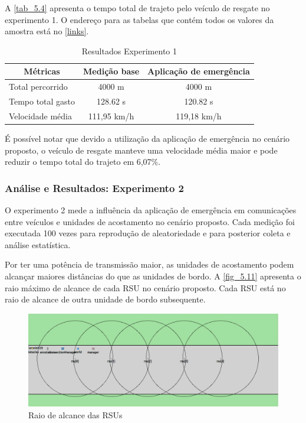 \documentclass[
12pt,				%
openright,			%
oneside,			%
a4paper,			%
brazil,				%
]{abntex2}
\begin{document}
	\par A \autoref{tab_5.4} apresenta o tempo total de trajeto pelo veículo de resgate no experimento 1. O endereço para as tabelas que contém todos os valores da amostra está no \autoref{links}.
		
	\begin{table}[H]
		\centering
		\renewcommand{\arraystretch}{1.5}
		\begin{tabular}{|l|c|c|}
			\hline
			\multicolumn{1}{|c|}{\textbf{Métricas}} & \textbf{Medição base} & \textbf{Aplicação de emergência} \\ \hline
			Total percorrido & 4000 m & 4000 m \\ \hline
			Tempo total gasto & 128.62 s & 120.82 s \\ \hline
			Velocidade média & 111,95 km/h & 119,18 km/h \\ \hline
		\end{tabular}
		\caption{Resultados Experimento 1}
		\label{tab_5.4}
	\end{table}
	
	\par É possível notar que devido a utilização da aplicação de emergência no cenário proposto, o veículo de resgate manteve uma velocidade média maior e pode reduzir o tempo total do trajeto em 6,07\%.
	
	\subsubsection{Análise e Resultados: Experimento 2}
	
	\par O experimento 2 mede a influência da aplicação de emergência em comunicações entre veículos e unidades de acostamento no cenário proposto. Cada medição foi executada 100 vezes para reprodução de aleatoriedade e para posterior coleta e análise estatística.
	
	\par Por ter uma potência de transmissão maior, as unidades de acostamento podem alcançar maiores distâncias do que as unidades de bordo. A \autoref{fig_5.11} apresenta o raio máximo de alcance de cada RSU no cenário proposto. Cada RSU está no raio de alcance de outra unidade de bordo subsequente.
	
	\begin{figure}[H]
		\centering
		\includegraphics[scale=.42]{figuras/cap5/511Experimento2TkEnv}
		\caption{\label{fig_5.11}Raio de alcance das RSUs}
	\end{figure}
	
\end{document}
